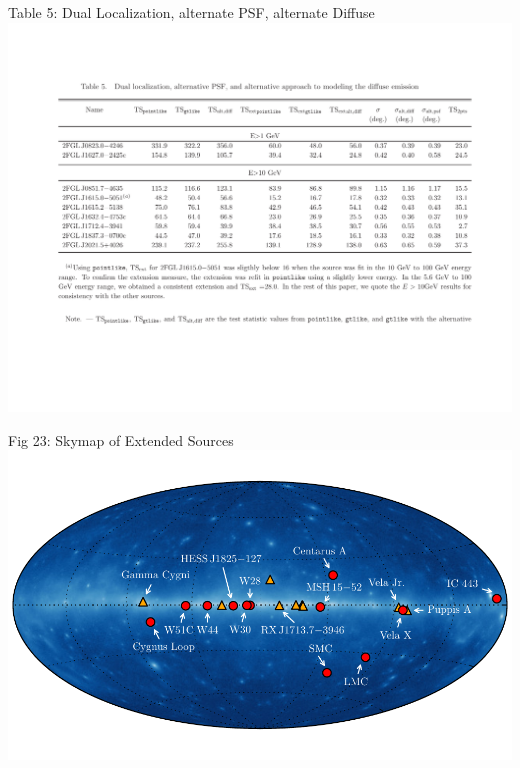 \documentclass[12pt]{beamer}
\begin{document}
\begin{frame}{Table 5: Dual Localization, alternate PSF, alternate Diffuse}
  \includegraphics[scale=0.45]{plots/alt_diff.pdf}
\end{frame}

\begin{frame}{Fig 23: Skymap of Extended Sources}
\includegraphics[scale=0.60]{plots/allsky_extended_sources_color.pdf}
\end{frame}
\end{document}
